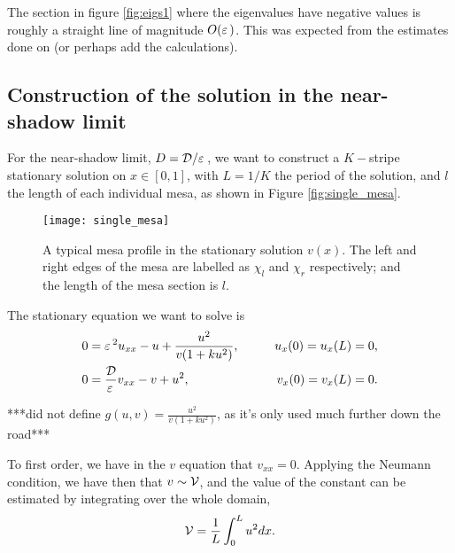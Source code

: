 The section in figure \ref{fig:eigs1} where the eigenvalues have negative values is roughly a straight line of magnitude $O(\varepsilon\,)$. This was expected from the estimates done on \cite{kolokolnikov_spot_2009} (or perhaps add the calculations).

\subsection{Construction of the solution in the near-shadow limit}

For the near-shadow limit, $D=\mathcal{D}/\varepsilon\,$, we want to construct a $K-$stripe stationary solution on $x\in[0,1]$, with $L=1/K$ the period of the solution, and $l$ the length of each individual mesa, as shown in Figure \eqref{fig:single_mesa}.
% 
\begin{figure}[htb]
\begin{center}
\texttt{[image: single\_mesa]}
\caption{A typical mesa profile in the stationary solution $v(x)$. The left and right edges of the mesa are labelled as $\chi_l$ and $\chi_r$ respectively; and the length of the mesa section is $l$.}
\label{fig:single_mesa}
\end{center}
\end{figure}
% 
The stationary equation we want to solve is
% 
\begin{equation}
\label{eqn:o-gms_stat}
\begin{split}
\begin{aligned}
	0 &= \varepsilon\,^2 u_{xx} -u + \frac{u^2}{v(1+ku^2)},\qquad &u_x(0)=u_x(L)=0, \\
	0 &= \frac{\mathcal{D}}{\varepsilon\,}v_{xx} - v + u^2,\qquad &v_x(0)=v_x(L)=0.
\end{aligned}
\end{split}
\end{equation}
% 

***did not define $g(u,v)=\frac{u^2}{v(1+ku^2)}$, as it's only used much further down the road***

To first order, we have in the $v$ equation that $v_{xx}=0$. Applying the Neumann condition, we have then that $v\sim\mathcal{V}$, and the value of the constant can be estimated by integrating over the whole domain,
% 
\begin{equation}
\label{eqn:o-v_first_order}
  \mathcal{V} = \frac{1}{L}\int_0^Lu^2dx.
\end{equation}
% 

